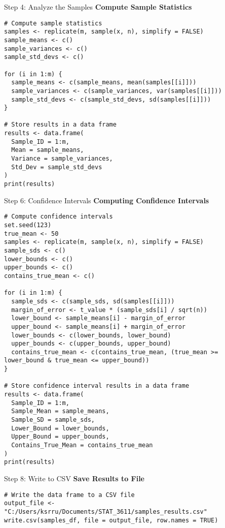 \documentclass{beamer}
\begin{document}
\begin{frame}{Step 4: Analyze the Samples}
    \textbf{Compute Sample Statistics}
    \begin{tcolorbox}[title=R Code]
\begin{verbatim}
# Compute sample statistics
samples <- replicate(m, sample(x, n), simplify = FALSE)
sample_means <- c()
sample_variances <- c()
sample_std_devs <- c()

for (i in 1:m) {
  sample_means <- c(sample_means, mean(samples[[i]]))
  sample_variances <- c(sample_variances, var(samples[[i]]))
  sample_std_devs <- c(sample_std_devs, sd(samples[[i]]))
}

# Store results in a data frame
results <- data.frame(
  Sample_ID = 1:m,
  Mean = sample_means,
  Variance = sample_variances,
  Std_Dev = sample_std_devs
)
print(results)
\end{verbatim}
    \end{tcolorbox}
\end{frame}

\begin{frame}{Step 6: Confidence Intervals}
    \textbf{Computing Confidence Intervals}
    \begin{tcolorbox}[title=R Code]
\begin{verbatim}
# Compute confidence intervals
set.seed(123)
true_mean <- 50
samples <- replicate(m, sample(x, n), simplify = FALSE)
sample_sds <- c()
lower_bounds <- c()
upper_bounds <- c()
contains_true_mean <- c()

for (i in 1:m) {
  sample_sds <- c(sample_sds, sd(samples[[i]]))
  margin_of_error <- t_value * (sample_sds[i] / sqrt(n))
  lower_bound <- sample_means[i] - margin_of_error
  upper_bound <- sample_means[i] + margin_of_error
  lower_bounds <- c(lower_bounds, lower_bound)
  upper_bounds <- c(upper_bounds, upper_bound)
  contains_true_mean <- c(contains_true_mean, (true_mean >= lower_bound & true_mean <= upper_bound))
}

# Store confidence interval results in a data frame
results <- data.frame(
  Sample_ID = 1:m,
  Sample_Mean = sample_means,
  Sample_SD = sample_sds,
  Lower_Bound = lower_bounds,
  Upper_Bound = upper_bounds,
  Contains_True_Mean = contains_true_mean
)
print(results)
\end{verbatim}
    \end{tcolorbox}
\end{frame}

\begin{frame}{Step 8: Write to CSV}
    \textbf{Save Results to File}
    \begin{tcolorbox}[title=R Code]
\begin{verbatim}
# Write the data frame to a CSV file
output_file <- "C:/Users/ksrru/Documents/STAT_3611/samples_results.csv"
write.csv(samples_df, file = output_file, row.names = TRUE)
\end{verbatim}
    \end{tcolorbox}
\end{frame}
\end{document}
